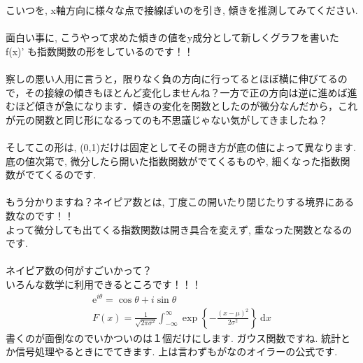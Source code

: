 \documentclass[11pt,a4paper]{jreport}
\begin{document}
こいつを, x軸方向に様々な点で接線ぽいのを引き, 傾きを推測してみてください. \\
\\
面白い事に, こうやって求めた傾きの値をy成分として新しくグラフを書いた f(x)' も指数関数の形をしているのです！！\\
\\
察しの悪い人用に言うと，限りなく負の方向に行ってるとほぼ横に伸びてるので，その接線の傾きもほとんど変化しませんね？一方で正の方向は逆に進めば進むほど傾きが急になります．傾きの変化を関数としたのが微分なんだから，これが元の関数と同じ形になるってのも不思議じゃない気がしてきましたね？\\
\\
そしてこの形は, (0,1)だけは固定としてその開き方が底の値によって異なります. \\
底の値次第で, 微分したら開いた指数関数がでてくるものや, 細くなった指数関数がでてくるのです.\\
\\
もう分かりますね？ネイピア数とは, 丁度この開いたり閉じたりする境界にある数なのです！！\\
よって微分しても出てくる指数関数は開き具合を変えず, 重なった関数となるのです.\\
\\
ネイピア数の何がすごいかって？\\
いろんな数学に利用できるところです！！！\\
\begin{eqnarray}
\mathrm{e}^{i\theta} = \cos\theta + i\sin\theta \\
F(x)=\frac{1}{\sqrt{2\pi \sigma^2}}\int_{-\infty}^{\infty}\exp{\left\{-\frac{(x-\mu)^2}{2\sigma^2}\right\}}\ \mathrm{d}x
\end{eqnarray}
書くのが面倒なのでいかついのは１個だけにします. ガウス関数ですね. 統計とか信号処理やるときにでてきます. 上は言わずもがなのオイラーの公式です.\\
\end{document}
